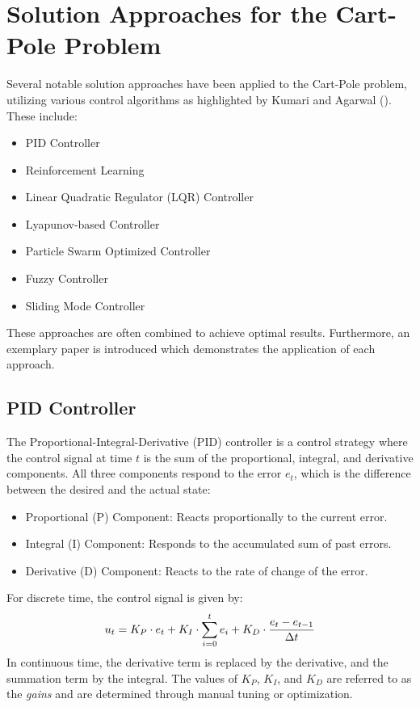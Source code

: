 \section{Solution Approaches for the Cart-Pole Problem}

Several notable solution approaches have been applied to the Cart-Pole problem, utilizing various control algorithms as highlighted by Kumari and Agarwal (\citeyear{kumari_root_2023}). These include:
\begin{itemize}
    \item PID Controller
    \item Reinforcement Learning
    \item Linear Quadratic Regulator (LQR) Controller
    \item Lyapunov-based Controller
    \item Particle Swarm Optimized Controller
    \item Fuzzy Controller
    \item Sliding Mode Controller
\end{itemize}

These approaches are often combined to achieve optimal results. Furthermore, an exemplary paper is introduced which demonstrates the application of each approach.

\subsection{PID Controller}

The Proportional-Integral-Derivative (PID) controller is a control strategy where the control signal at time $t$ is the sum of the proportional, integral, and derivative components. All three components respond to the error $e_t$, which is the difference between the desired and the actual state:
\begin{itemize}
    \item Proportional (P) Component: Reacts proportionally to the current error.
    \item Integral (I) Component: Responds to the accumulated sum of past errors.
    \item Derivative (D) Component: Reacts to the rate of change of the error.
\end{itemize}
For discrete time, the control signal is given by:
\begin{align}
    u_t = K_P\cdot e_t + K_I\cdot\sum_{i=0}^t e_i + K_D\cdot\frac{e_t - e_{t-1}}{\Delta t} \notag
\end{align}
In continuous time, the derivative term is replaced by the derivative, and the summation term by the integral. The values of $K_P$, $K_I$, and $K_D$ are referred to as the \textit{gains} and are determined through manual tuning or optimization.

